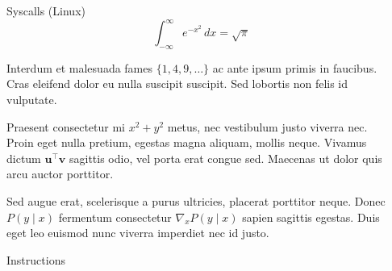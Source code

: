 \documentclass[final]{beamer}
\newlength{\sepwidth}
\newlength{\colwidth}
\newcommand{\separatorcolumn}{\begin{column}{\sepwidth}\end{column}}
\begin{document}
\begin{frame}[t]
\begin{columns}[t]
\begin{column}{\colwidth}
\begin{block}{Syscalls (Linux)}
    $$
    \int_{-\infty}^{\infty} e^{-x^2}\,dx = \sqrt{\pi}
    $$

    Interdum et malesuada fames $\{1, 4, 9, \ldots\}$ ac ante ipsum primis in
    faucibus. Cras eleifend dolor eu nulla suscipit suscipit. Sed lobortis non
    felis id vulputate.


    Praesent consectetur mi $x^2 + y^2$ metus, nec vestibulum justo viverra
    nec. Proin eget nulla pretium, egestas magna aliquam, mollis neque. Vivamus
    dictum $\mathbf{u}^\intercal\mathbf{v}$ sagittis odio, vel porta erat
    congue sed. Maecenas ut dolor quis arcu auctor porttitor.


    Sed augue erat, scelerisque a purus ultricies, placerat porttitor neque.
    Donec $P(y \mid x)$ fermentum consectetur $\nabla_x P(y \mid x)$ sapien
    sagittis egestas. Duis eget leo euismod nunc viverra imperdiet nec id
    justo.
  \end{block}

  \begin{block}{Instructions}
  \end{block}
\end{column}
\separatorcolumn

\end{columns}
\end{frame}
\end{document}
